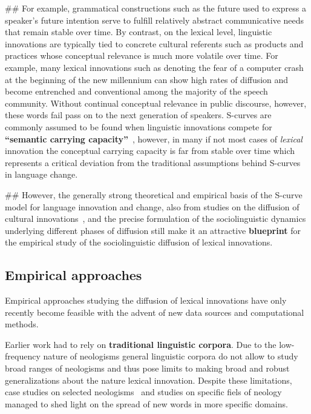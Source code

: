 \documentclass[
  a4paper,
  ]{scrartcl}
\renewcommand{\hw}[1]{\textbf{#1}}
\begin{document}
\begin{easylist}[itemize]
        ## For example, grammatical constructions such as the  future used to express a speaker's future intention serve to fulfill relatively abstract communicative needs that remain stable over time. By contrast, on the lexical level, linguistic innovations are typically tied to concrete cultural referents such as products and practices whose conceptual relevance is much more volatile over time. For example, many lexical innovations such as  denoting the fear of a computer crash at the beginning of the new millennium can show high rates of diffusion and become entrenched and conventional among the majority of the speech community. Without continual conceptual relevance in public discourse, however, these words fail pass on to the next generation of speakers. S-curves are commonly assumed to be found when linguistic innovations compete for \hw{\enquote{semantic carrying capacity}}~\parencite{Nini2017}, however, in many if not most cases of \emph{lexical} innovation the conceptual carrying capacity is far from stable over time which represents a critical deviation from the traditional assumptions behind S-curves in language change.

        ## However, the generally strong theoretical and empirical basis of the S-curve model for language innovation and change, also from studies on the diffusion of cultural innovations~\parencite{Rogers1962}, and the precise formulation of the sociolinguistic dynamics underlying different phases of diffusion still make it an attractive \hw{blueprint} for the empirical study of the sociolinguistic diffusion of lexical innovations.

    \end{easylist}

  \subsection{Empirical approaches}

    Empirical approaches studying the diffusion of lexical innovations have only recently become feasible with the advent of new data sources and computational methods.

    Earlier work had to rely on \hw{traditional linguistic corpora}. Due to the low-frequency nature of neologisms general linguistic corpora do not allow to study broad ranges of neologisms and thus pose limits to making broad and robust generalizations about the nature lexical innovation. Despite these limitations, case studies on selected neologisms~\parencite{Hohenhaus2006} and studies on specific fiels of neology~\parencite{Elsen2004} managed to shed light on the spread of new words in more specific domains.
\end{document}
